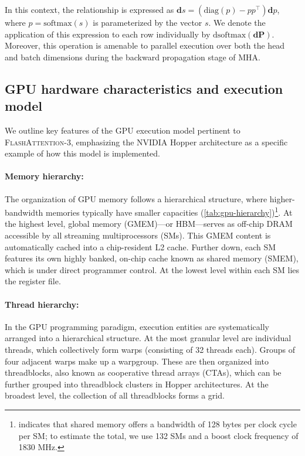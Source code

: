 \begin{enumerate}
In this context, the relationship is expressed as $\mathbf{d}s = (\mathrm{diag}(p) - p p^\top)\mathbf{d}p$, where $p = \mathrm{softmax}(s)$ is parameterized by the vector $s$. We denote the application of this expression to each row individually by $\mathrm{dsoftmax}(\mathbf{dP})$. Moreover, this operation is amenable to parallel execution over both the head and batch dimensions during the backward propagation stage of MHA.

\subsection{GPU hardware characteristics and execution model}
\label{subsec:hardware}

We outline key features of the GPU execution model pertinent to \textsc{FlashAttention-3}, emphasizing the NVIDIA Hopper architecture as a specific example of how this model is implemented.

\paragraph{Memory hierarchy:} The organization of GPU memory follows a hierarchical structure, where higher-bandwidth memories typically have smaller capacities (\cref{tab:gpu-hierarchy})\footnote{\citet{luo2024benchmarking} indicates that shared memory offers a bandwidth of 128 bytes per clock cycle per SM; to estimate the total, we use 132 SMs and a boost clock frequency of 1830 MHz.}. At the highest level, global memory (GMEM)—or HBM—serves as off-chip DRAM accessible by all streaming multiprocessors (SMs). This GMEM content is automatically cached into a chip-resident L2 cache. Further down, each SM features its own highly banked, on-chip cache known as shared memory (SMEM), which is under direct programmer control. At the lowest level within each SM lies the register file.

\paragraph{Thread hierarchy:} In the GPU programming paradigm, execution entities are systematically arranged into a hierarchical structure. At the most granular level are individual threads, which collectively form warps (consisting of 32 threads each). Groups of four adjacent warps make up a warpgroup. These are then organized into threadblocks, also known as cooperative thread arrays (CTAs), which can be further grouped into threadblock clusters in Hopper architectures. At the broadest level, the collection of all threadblocks forms a grid.


\end{enumerate}
